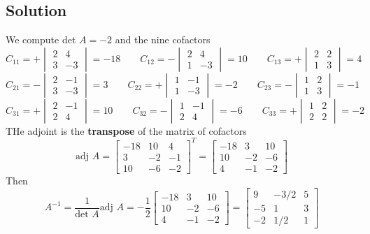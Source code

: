 \subsection*{Solution}
We compute det $A=-2$ and the nine cofactors
\[C_{11}=+\begin{vmatrix}
        2 & 4  \\
        3 & -3
    \end{vmatrix}=-18 \qquad C_{12}=-\begin{vmatrix}
        2 & 4  \\
        1 & -3
    \end{vmatrix}=10 \qquad C_{13}=+\begin{vmatrix}
        2 & 2 \\
        1 & 3
    \end{vmatrix}=4\]
\[C_{21}=-\begin{vmatrix}
        2 & -1 \\
        3 & -3
    \end{vmatrix}=3 \qquad C_{22}=+\begin{vmatrix}
        1 & -1 \\
        1 & -3
    \end{vmatrix}=-2 \qquad C_{23}=-\begin{vmatrix}
        1 & 2 \\
        1 & 3
    \end{vmatrix}=-1\]
\[C_{31}=+\begin{vmatrix}
        2 & -1 \\
        2 & 4
    \end{vmatrix}=10 \qquad C_{32}=-\begin{vmatrix}
        1 & -1 \\
        2 & 4
    \end{vmatrix}=-6 \qquad C_{33}=+\begin{vmatrix}
        1 & 2 \\
        2 & 2
    \end{vmatrix}=-2\]
THe adjoint is the \textbf{transpose} of the matrix of cofactors
\[\text{adj }A=\begin{bmatrix}
        -18 & 10 & 4  \\
        3   & -2 & -1 \\
        10  & -6 & -2
    \end{bmatrix}^T=\begin{bmatrix}
        -18 & 3  & 10 \\
        10  & -2 & -6 \\
        4   & -1 & -2
    \end{bmatrix}\]
Then
\[
    A^{-1}=\frac{1}{\text{det }A}\text{adj } A=-\frac{1}{2}\begin{bmatrix}
        -18 & 3  & 10 \\
        10  & -2 & -6 \\
        4   & -1 & -2
    \end{bmatrix}=\begin{bmatrix}
        9  & -3/2 & 5 \\
        -5 & 1    & 3 \\
        -2 & 1/2  & 1
    \end{bmatrix}
\]

